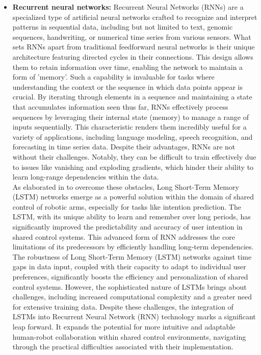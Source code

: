 \begin{itemize}
    \item\textbf{Recurrent neural networks:} Recurrent Neural Networks (RNNs) are a specialized type of artificial neural networks crafted to recognize and interpret patterns in sequential data, including but not limited to text, genomic sequences, handwriting, or numerical time series from various sensors. What sets RNNs apart from traditional feedforward neural networks is their unique architecture featuring directed cycles in their connections.
    This design allows them to retain information over time, enabling the network to maintain a form of 'memory'.
    Such a capability is invaluable for tasks where understanding the context or the sequence in which data points appear is crucial.
    By iterating through elements in a sequence and maintaining a state that accumulates information seen thus far, RNNs effectively process sequences by leveraging their internal state (memory) to manage a range of inputs sequentially. This characteristic renders them incredibly useful for a variety of applications, including language modeling, speech recognition, and forecasting in time series data.
    Despite their advantages, RNNs are not without their challenges. Notably, they can be difficult to train effectively due to issues like vanishing and exploding gradients, which hinder their ability to learn long-range dependencies within the data.\\
    As elaborated in \cite{10.1162/neco_a_01199} to overcome these obstacles, Long Short-Term Memory (LSTM) networks emerge as a powerful solution within the domain of shared control of robotic arms, especially for tasks like intention prediction. 
    The LSTM, with its unique ability to learn and remember over long periods, has significantly improved the predictability and accuracy of user intention in shared control systems. This advanced form of RNN addresses the core limitations of its predecessors by efficiently handling long-term dependencies. 
    The robustness of Long Short-Term Memory (LSTM) networks against time gaps in data input, coupled with their capacity to adapt to individual user preferences, significantly boosts the efficiency and personalization of shared control systems.
    However, the sophisticated nature of LSTMs brings about challenges, including increased computational complexity and a greater need for extensive training data. Despite these challenges, the integration of LSTMs into Recurrent Neural Network (RNN) technology marks a significant leap forward. 
    It expands the potential for more intuitive and adaptable human-robot collaboration within shared control environments, navigating through the practical difficulties associated with their implementation.
\end{itemize}



